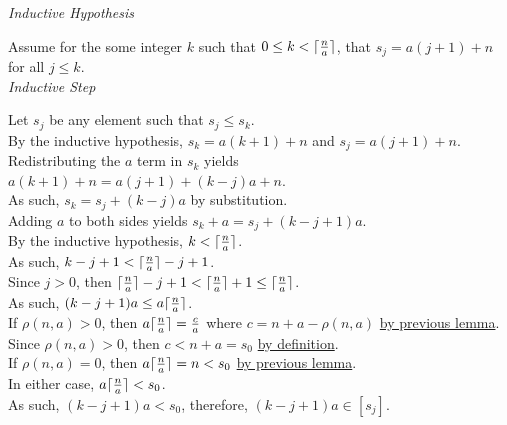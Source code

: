 \documentclass[a4paper,12pt]{article}
\DeclarePairedDelimiter{\ceil}{\lceil}{\rceil}
\begin{document}
\noindent
\textit{Inductive Hypothesis}

\noindent Assume for the some integer $k$ such that $0 \leq k < \ceil{\frac{n}{a}}$, that $s_j = a(j + 1) + n$ for all $j \leq k$.\\

\noindent
\textit{Inductive Step}

\noindent Let $s_j$ be any element such that $s_j \leq s_k$.\\

\noindent By the inductive hypothesis, $s_k = a(k + 1) + n$ and $s_j = a(j + 1) + n$.\\

\noindent Redistributing the $a$ term in $s_k$ yields $a(k + 1) + n = a(j + 1) + (k - j)a + n$.\\

\noindent As such, $s_k = s_j + (k - j)a$ by substitution.\\

\noindent Adding $a$ to both sides yields $s_k + a = s_j + (k - j + 1)a$.\\

\noindent By the inductive hypothesis, $k < \ceil{\frac{n}{a}}$.\\

\noindent As such, $k - j + 1 < \ceil{\frac{n}{a}} - j + 1$.\\

\noindent Since $j > 0$, then $\ceil{\frac{n}{a}} - j + 1 < \ceil{\frac{n}{a}} + 1 \leq \ceil{\frac{n}{a}}$.\\

\noindent As such, $(k - j + 1)a \leq a\ceil{\frac{n}{a}}$.\\

\noindent If $\rho(n, a) > 0$, then $a\ceil{\frac{n}{a}} = \frac{c}{a}$ where $c = n + a - \rho(n, a)$ \hyperlink{lemma:ceiling_function}{by previous lemma}.\\

\noindent Since $\rho(n, a) > 0$, then $c < n + a = s_0$ \hyperlink{definition:awkward_number_series}{by definition}.\\

\noindent If $\rho(n, a) = 0$, then $a\ceil{\frac{n}{a}} = n < s_0$ \hyperlink{lemma:ceiling_function}{by previous lemma}.\\

\noindent In either case, $a\ceil{\frac{n}{a}} < s_0$.\\

\noindent As such, $(k - j + 1)a < s_0$, therefore, $(k - j + 1)a \in [s_j]$.\\
\end{document}
